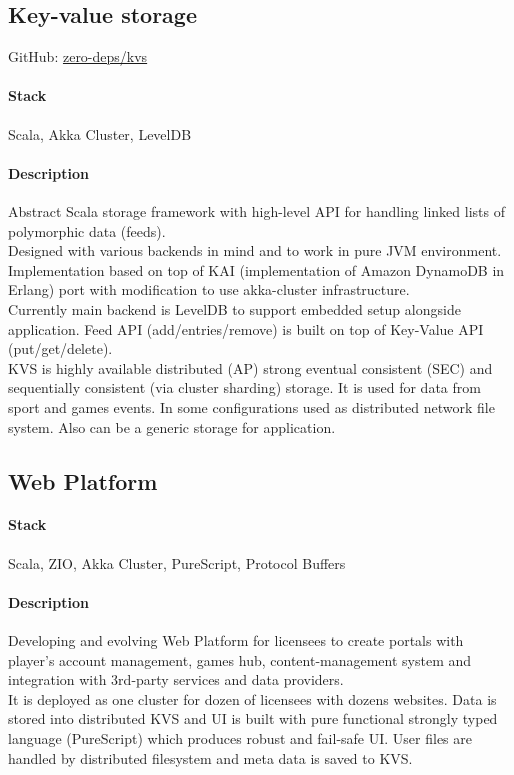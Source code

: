 \subsection{Key-value storage}
GitHub: \href{https://github.com/zero-deps/kvs}{zero-deps/kvs}
\paragraph{Stack} Scala, Akka Cluster, LevelDB
\paragraph{Description}
Abstract Scala storage framework with high-level API for handling linked lists of polymorphic data (feeds).\\
Designed with various backends in mind and to work in pure JVM environment. Implementation based on top of KAI (implementation of Amazon DynamoDB in Erlang) port with modification to use akka-cluster infrastructure.\\
Currently main backend is LevelDB to support embedded setup alongside application. Feed API (add/entries/remove) is built on top of Key-Value API (put/get/delete).\\
KVS is highly available distributed (AP) strong eventual consistent (SEC) and sequentially consistent (via cluster sharding) storage. It is used for data from sport and games events. In some configurations used as distributed network file system. Also can be a generic storage for application.

\subsection{Web Platform}
\paragraph{Stack} Scala, ZIO, Akka Cluster, PureScript, Protocol Buffers
\paragraph{Description}
Developing and evolving Web Platform for licensees to create portals with player's account management, games hub, content-management system and integration with 3rd-party services and data providers.\\
It is deployed as one cluster for dozen of licensees with dozens websites. Data is stored into distributed KVS and UI is built with pure functional strongly typed language (PureScript) which produces robust and fail-safe UI. User files are handled by distributed filesystem and meta data is saved to KVS.

